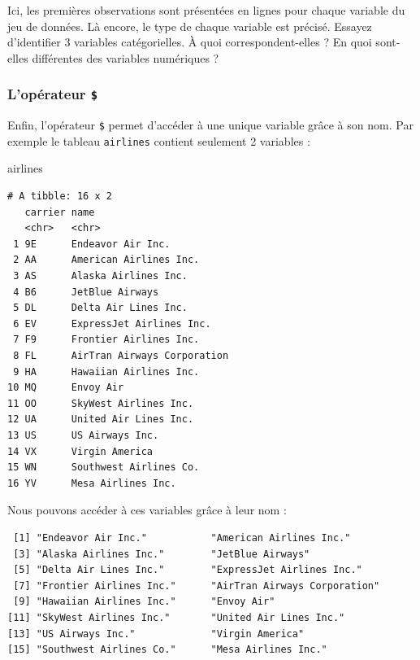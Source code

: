\documentclass[a4paperpaper,]{article}
\newenvironment{Shaded}{\begin{snugshade}}{\end{snugshade}}
\newcommand{\OperatorTok}[1]{\textcolor[rgb]{0.81,0.36,0.00}{\textbf{#1}}}
\newcommand{\NormalTok}[1]{#1}
\theoremstyle{definition}
\theoremstyle{definition}
\theoremstyle{definition}
\theoremstyle{remark}
\begin{document}
Ici, les premières observations sont présentées en lignes pour chaque
variable du jeu de données. Là encore, le type de chaque variable est
précisé. Essayez d'identifier 3 variables catégorielles. À quoi
correspondent-elles ? En quoi sont-elles différentes des variables
numériques ?

\subsubsection{\texorpdfstring{L'opérateur
\texttt{\$}}{L'opérateur \$}}\label{loperateur}

Enfin, l'opérateur \texttt{\$} permet d'accéder à une unique variable
grâce à son nom. Par exemple le tableau \texttt{airlines} contient
seulement 2 variables :

\begin{Shaded}
\begin{Highlighting}[]
\NormalTok{airlines}
\end{Highlighting}
\end{Shaded}

\begin{verbatim}
# A tibble: 16 x 2
   carrier name                       
   <chr>   <chr>                      
 1 9E      Endeavor Air Inc.          
 2 AA      American Airlines Inc.     
 3 AS      Alaska Airlines Inc.       
 4 B6      JetBlue Airways            
 5 DL      Delta Air Lines Inc.       
 6 EV      ExpressJet Airlines Inc.   
 7 F9      Frontier Airlines Inc.     
 8 FL      AirTran Airways Corporation
 9 HA      Hawaiian Airlines Inc.     
10 MQ      Envoy Air                  
11 OO      SkyWest Airlines Inc.      
12 UA      United Air Lines Inc.      
13 US      US Airways Inc.            
14 VX      Virgin America             
15 WN      Southwest Airlines Co.     
16 YV      Mesa Airlines Inc.         
\end{verbatim}

Nous pouvons accéder à ces variables grâce à leur nom :

\begin{Shaded}
\end{Shaded}

\begin{verbatim}
 [1] "Endeavor Air Inc."           "American Airlines Inc."     
 [3] "Alaska Airlines Inc."        "JetBlue Airways"            
 [5] "Delta Air Lines Inc."        "ExpressJet Airlines Inc."   
 [7] "Frontier Airlines Inc."      "AirTran Airways Corporation"
 [9] "Hawaiian Airlines Inc."      "Envoy Air"                  
[11] "SkyWest Airlines Inc."       "United Air Lines Inc."      
[13] "US Airways Inc."             "Virgin America"             
[15] "Southwest Airlines Co."      "Mesa Airlines Inc."         
\end{verbatim}
\end{document}
